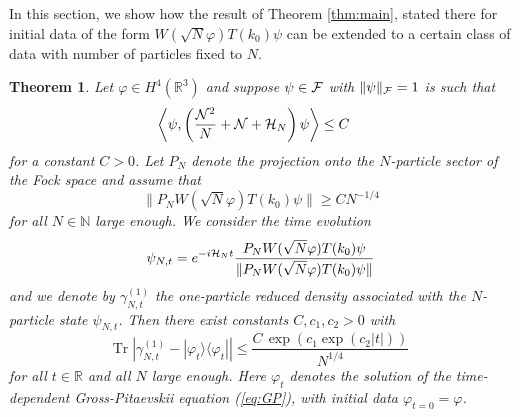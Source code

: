 \documentclass[11pt,a4paper]{article}
\newtheorem{thm}{Theorem}[section]  %
\newcommand{\bR}{{\mathbb R}}
\newcommand{\bN}{{\mathbb N}}
\newcommand{\tr}{\mbox{Tr}}
\newcommand{\cF}{{\cal F}}
\newcommand{\cH}{{\cal H}}
\newcommand{\cN}{{\cal N}}
\begin{document}
In this section, we show how the result of Theorem \ref{thm:main}, stated there for initial data of the form $W(\sqrt{N} \varphi) T(k_0) \psi$ can be extended to a certain class of data with number of particles fixed to $N$. 
\begin{thm}\label{thm:Npart}
Let $\varphi \in H^4 (\bR^3)$ and suppose $\psi \in \cF$ with $\| \psi \|_\cF  =1$ is such that \begin{equation}\label{eq:ass1-N} \begin{split} \left\langle \psi , \left( \frac{\cN^2}{N} + \cN + \cH_N \right) \psi \right\rangle &\leq C  \end{split} \end{equation}
for a constant $C>0$. Let $P_N$ denote the projection onto the $N$-particle sector of the Fock space and assume that 
\begin{equation}\label{eq:ass2-N} \| P_N W(\sqrt{N} \varphi) T(k_0) \psi \| \geq C N^{-1/4} \end{equation}
for all $N \in \bN$ large enough. We consider the time evolution 
\[ \psi_{N,t} = e^{-i \cH_N t} \frac{P_N W(\sqrt{N} \varphi) T(k_0) \psi}{\| P_N W(\sqrt{N} \varphi) T(k_0) \psi \|} \] and we denote by $\gamma_{N,t}^{(1)}$ the one-particle reduced density associated with the $N$-particle state $\psi_{N,t}$. Then there exist constants $C, c_1 ,c_2 > 0$ with 
\[ \tr  \; \left| \gamma^{(1)}_{N,t} - | \varphi_t \rangle \langle \varphi_t| \right| \leq \frac{C\,  \exp \left( c_1 \exp (c_2 |t|) \right)}{N^{1/4}} \]
for all $t \in \bR$ and all $N$ large enough. Here $\varphi_t$ denotes the solution of the time-dependent Gross-Pitaevskii equation (\ref{eq:GP}), with initial data $\varphi_{t=0} = \varphi$. 
\end{thm}
\end{document}
